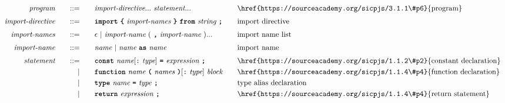 \begin{alignat*}{9}
&& \textit{program}    &&\quad ::= &\quad && \textit{import-directive} ... \ \textit{statement} ...
                                                           && \textrm{\href{https://sourceacademy.org/sicpjs/3.1.1\#p6}{program}} \\[1mm]
&& \textit{import-directive}    &&\quad ::= &\quad && \textbf{\texttt{import}}\ \textbf{\texttt{\{}}\ \textit{import-names} \ \textbf{\texttt{\}}}\ \textbf{\texttt{from}}\  \textit{string} \ \textbf{\texttt{;}} \quad
                                                           && \textrm{import directive} \\[1mm]
&& \textit{import-names}   && ::= &\quad &&  \epsilon\ | \  \textit{import-name} \ 
                                                   (\ \textbf{\texttt{,}} \ \textit{import-name}\ ) ...
                                                            && \textrm{import name list}   \\[1mm]
&& \textit{import-name}   && ::= &\quad &&  \textit{name}\ | \  \textit{name} \ \textbf{\texttt{as}}\ \textit{name} 
                                                            && \textrm{import name}   \\[1mm]
&& \textit{statement}    &&\quad ::= &\quad && \textbf{\texttt{const}}\  \textit{name}[\texttt{:}\ \textit{type}] \ 
                                           \textbf{\texttt{=}}\  \textit{expression} \ \textbf{\texttt{;}}
                                                           && \textrm{\href{https://sourceacademy.org/sicpjs/1.1.2\#p2}{constant declaration}} \\
&&                       && |   &\quad && \textbf{\texttt{function}}\  \textit{name} \ 
                                   \textbf{\texttt{(}}\  \textit{names} \ \textbf{\texttt{)}}[\texttt{:}\ \textit{type}]\ \textit{block} \quad
                                                           && \textrm{\href{https://sourceacademy.org/sicpjs/1.1.4\#p4}{function declaration}}\\
&&                       && |   &\quad && \textbf{\texttt{type}}\  \textit{name} \ 
                                            \textbf{\texttt{=}}\  \textit{type} \ \textbf{\texttt{;}}
                                                           && \textrm{type alias declaration}\\
&&                       && |   &\quad && \textbf{\texttt{return}}\  \textit{expression} \ \textbf{\texttt{;}}
                                                           && \textrm{\href{https://sourceacademy.org/sicpjs/1.1.4\#p4}{return statement}}\\

\end{alignat*}
